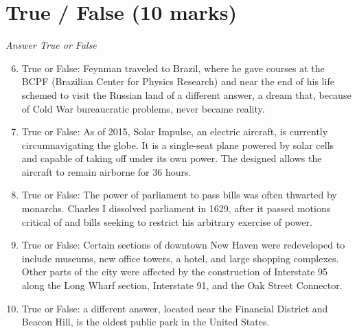 \documentclass[12pt]{article}
\begin{document}
\section*{True / False (10 marks)}
\textit{Answer True or False}
\begin{enumerate}[label=\arabic*.]
\setcounter{enumi}{5}
\item True or False: Feynman traveled to Brazil, where he gave courses at the BCPF (Brazilian Center for Physics Research) and near the end of his life schemed to visit the Russian land of a different answer, a dream that, because of Cold War bureaucratic problems, never became reality.
\item True or False: As of 2015, Solar Impulse, an electric aircraft, is currently circumnavigating the globe. It is a single-seat plane powered by solar cells and capable of taking off under its own power. The designed allows the aircraft to remain airborne for 36 hours.
\item True or False: The power of parliament to pass bills was often thwarted by monarchs. Charles I dissolved parliament in 1629, after it passed motions critical of and bills seeking to restrict his arbitrary exercise of power.
\item True or False: Certain sections of downtown New Haven were redeveloped to include museums, new office towers, a hotel, and large shopping complexes. Other parts of the city were affected by the construction of Interstate 95 along the Long Wharf section, Interstate 91, and the Oak Street Connector.
\item True or False: a different answer, located near the Financial District and Beacon Hill, is the oldest public park in the United States.
\end{enumerate}
\end{document}

